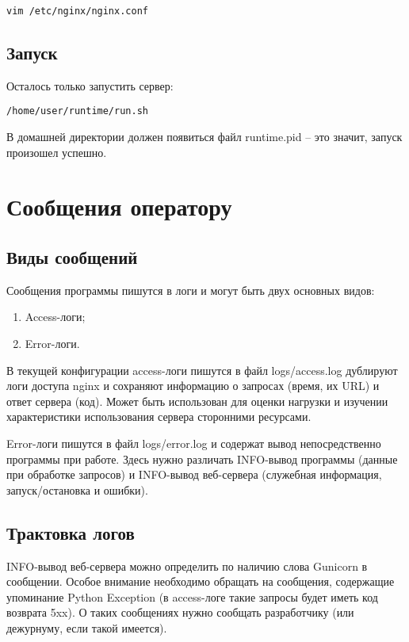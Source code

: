 \documentclass[progmanual]{espd}
\begin{document}
\begin{verbatim}
vim /etc/nginx/nginx.conf
\end{verbatim}

\subsection{Запуск}
Осталось только запустить сервер:

\begin{verbatim}
/home/user/runtime/run.sh
\end{verbatim}

В домашней директории должен появиться файл runtime.pid -- это значит, запуск произошел успешно.

\section{Сообщения оператору}
\subsection{Виды сообщений}
Сообщения программы пишутся в логи и могут быть двух основных видов:
\begin{enumerate}
\item Access-логи;
\item Error-логи.
\end{enumerate}

В текущей конфигурации access-логи пишутся в файл logs/access.log дублируют логи доступа nginx и сохраняют информацию о запросах (время, их URL) и ответ сервера (код). Может быть использован для оценки нагрузки и изучении характеристики использования сервера сторонними ресурсами.

Error-логи пишутся в файл logs/error.log и содержат вывод непосредственно программы при работе. Здесь нужно различать INFO-вывод программы (данные при обработке запросов) и INFO-вывод веб-сервера (служебная информация, запуск/остановка и ошибки).

\subsection{Трактовка логов}

INFO-вывод веб-сервера можно определить по наличию слова Gunicorn в сообщении. Особое внимание необходимо обращать на сообщения, содержащие упоминание Python Exception (в access-логе такие запросы будет иметь код возврата 5xx). О таких сообщениях нужно сообщать разработчику (или дежурнуму, если такой имеется).
\end{document}
